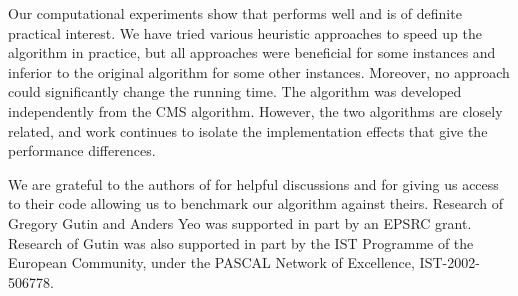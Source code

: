 \documentclass[11pt]{article}
\newcommand{\2}{\vspace{0.2 cm}}
\begin{document}
Our computational experiments show that  performs well and
is of definite practical interest. We have tried various heuristic
approaches to speed up the algorithm in practice, but all approaches
were beneficial for some instances and inferior to the original
algorithm for some other instances. Moreover, no approach could
significantly change the running time. The algorithm was developed
independently from the CMS algorithm. However, the two algorithms
are closely related, and work continues to isolate the
implementation effects that give the performance differences.


\2 \2

  We are grateful to the authors of
\cite{chen} for helpful discussions and for giving us access to
their code allowing us to benchmark our algorithm against theirs.
Research of Gregory Gutin and Anders Yeo was supported in part by an
EPSRC grant. Research of Gutin was also supported in part by the IST
Programme of the European Community, under the PASCAL Network of
Excellence, IST-2002-506778.
\end{document}
